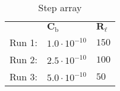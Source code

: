 \begin{table}[H]
\centering
\begin{tabular}[c]{lll}
\textbf{ } & $\mathbf{C_{\mathrm{b}}}$ & $\mathbf{R_{\ell}}$ \\ 
\rowcolor{myyellow}
\small{Run 1:} &$1.0 \cdot 10^{-10}$ &$150$ \\ 
\small{Run 2:} &$2.5 \cdot 10^{-10}$ &$100$ \\ 
\rowcolor{myyellow}
\small{Run 3:} &$5.0 \cdot 10^{-10}$ &$50$ \\ 
\end{tabular}
\caption{Step array}
\label{tab-stepdict}
\end{table}

